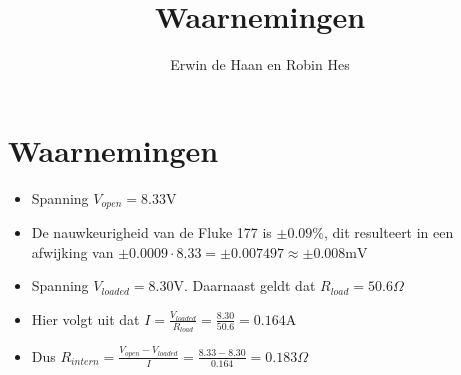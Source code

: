 \documentclass[11pt]{article} %
\title{Waarnemingen}
\author{Erwin de Haan en Robin Hes}
\begin{document}
\maketitle

\section{Waarnemingen}

\begin{itemize}
	\item Spanning $V_{open} = 8.33 \textrm{V}$
	\item De nauwkeurigheid van de Fluke 177 is $\pm0.09\%$, dit resulteert in een afwijking van $\pm0.0009\cdot8.33=\pm0.007497 \approx \pm0.008 \textrm{mV}$
	\item Spanning $V_{loaded} = 8.30 \textrm{V}$. Daarnaast geldt dat $R_{load} = 50.6 \Omega$
	\item Hier volgt uit dat $I = \frac{V_{loaded}}{R_{load}} = \frac{8.30}{50.6} = 0.164 \textrm{A}$
	\item Dus $R_{intern} = \frac{V_{open}-V_{loaded}}{I} = \frac{8.33-8.30}{0.164} = 0.183 \Omega$
\end{itemize}
\end{document}

